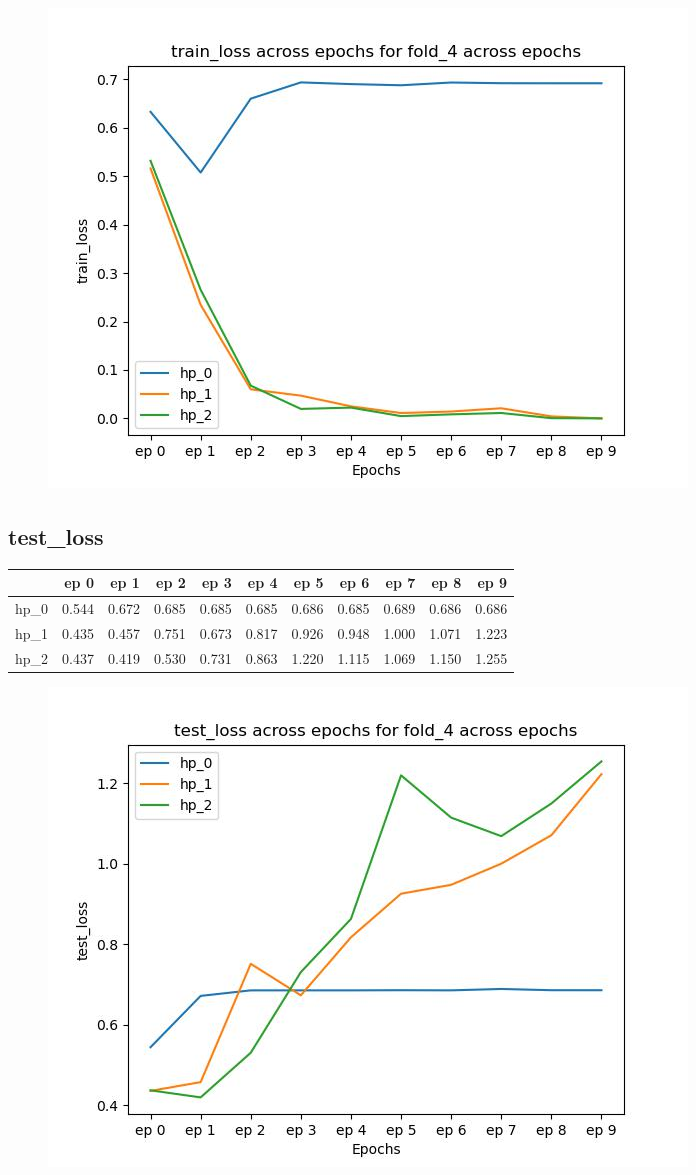 \documentclass{article}
\begin{document}
\begin{figure}[H]
\includegraphics[scale = 0.75]{fold_4/train_loss}
\end{figure}
\subsection{test\_loss}
\begin{tabular}{lrrrrrrrrrr}
\toprule
{} &   ep 0 &   ep 1 &   ep 2 &   ep 3 &   ep 4 &   ep 5 &   ep 6 &   ep 7 &   ep 8 &   ep 9 \\
\midrule
hp\_0 &  0.544 &  0.672 &  0.685 &  0.685 &  0.685 &  0.686 &  0.685 &  0.689 &  0.686 &  0.686 \\
hp\_1 &  0.435 &  0.457 &  0.751 &  0.673 &  0.817 &  0.926 &  0.948 &  1.000 &  1.071 &  1.223 \\
hp\_2 &  0.437 &  0.419 &  0.530 &  0.731 &  0.863 &  1.220 &  1.115 &  1.069 &  1.150 &  1.255 \\
\bottomrule
\end{tabular}

\begin{figure}[H]
\includegraphics[scale = 0.75]{fold_4/test_loss}
\end{figure}
\end{document}
